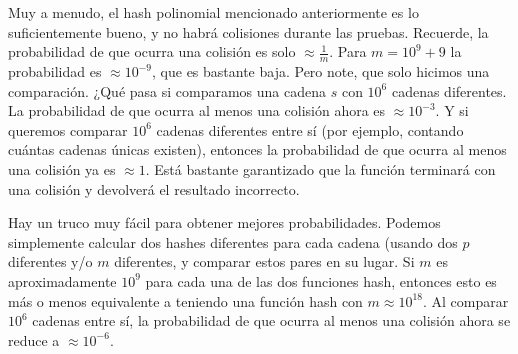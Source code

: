 Muy a menudo, el hash polinomial mencionado anteriormente es lo suficientemente bueno, y no habrá colisiones durante las pruebas. Recuerde, la probabilidad de que ocurra una colisión es solo $\approx \frac{1}{m}$. Para $m = 10^9 + 9$ la probabilidad es $\approx 10^{-9}$, que es bastante baja. Pero note, que solo hicimos una comparación. ¿Qué pasa si comparamos una cadena $s$ con $10^6$ cadenas diferentes. La probabilidad de que ocurra al menos una colisión ahora es $\approx 10^{-3}$. Y si queremos comparar $10^6$ cadenas diferentes entre sí (por ejemplo, contando cuántas cadenas únicas existen), entonces la probabilidad de que ocurra al menos una colisión ya es $\approx 1$. Está bastante garantizado que la función terminará con una colisión y devolverá el resultado incorrecto.


Hay un truco muy fácil para obtener mejores probabilidades. Podemos simplemente calcular dos hashes diferentes para cada cadena (usando dos $p$ diferentes y/o $m$ diferentes, y comparar estos pares en su lugar. Si $m$ es aproximadamente $10^9$ para cada una de las dos funciones hash, entonces esto es más o menos equivalente a teniendo una función hash con $m \approx 10^{18}$. Al comparar $10^6$ cadenas entre sí, la probabilidad de que ocurra al menos una colisión ahora se reduce a $\approx 10^{-6}$.





